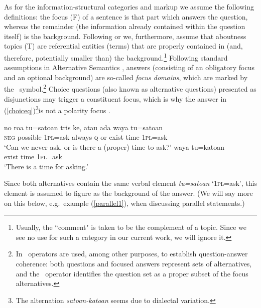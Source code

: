 \documentclass[output=paper
,modfonts
,nonflat]{langsci/langscibook}
\begin{document}
As for the information-structural categories and markup we assume the following definitions: the focus (F) of a sentence is that part which answers the question, whereas the remainder (the information already contained within the question itself) is the background. Following \citet{reita81,jacjo01} or \citet{Krifka2008} we, furthermore, assume that aboutness topics (T) are referential entities (terms) that are properly contained in (and, therefore, potentially smaller than) the background.\footnote{Usually, the ``comment" is taken to be the complement of a topic. Since we see no use for such a category in our current work, we will ignore it.} Following standard assumptions in Alternative Semantics \citep{rooma92,bueda08,bueda16}, answers (consisting of an obligatory focus and an optional background) are so-called \textit{focus domains}, which are marked by the \sq\ symbol.\footnote{In \citet[85ff.]{rooma92} \sq\ operators are used, among other purposes, to establish question-answer coherence: both questions and focused answers represent sets of alternatives, and the \sq\ operator identifies the question set as a proper subset of the focus alternatives.}
Choice questions (also known as alternative questions) presented as disjunctions may trigger a constituent focus, which is why the answer in (\ref{choiceq})\footnote{The alternation \textit{satoan-katoan} seems due to dialectal variation.}is not a polarity focus .

\begin{exe}\label{choiceq}
	\ex
	\begin{xlist}[Q\textsubscript{{27}}:]
		\gll no	roa	tu=satoan	tris	ke, atau	ada	waya	tu=satoan\\
		\textsc{neg}	possible	\textsc{1pl}=ask	always	\textsc{q}	or	exist	time	\textsc{1pl}=ask\\
		\glt `Can we never ask, or is there a (proper) time to ask?'
			{waya{\cb}\focus}	{tu=katoan{\cb}\sq}\\
		\hphantom{[[}exist	time	\textsc{1pl}=ask\\
		\glt `There is a time for asking.'
	\end{xlist}
\end{exe}

\noindent Since both alternatives contain the same verbal element \textit{tu=satoan} `\textsc{1pl}=ask', this element is assumed to figure as the background of the answer. (We will say more on this below, e.g.\ example (\ref{parallel1}), when discussing parallel statements.) 
\end{document}
